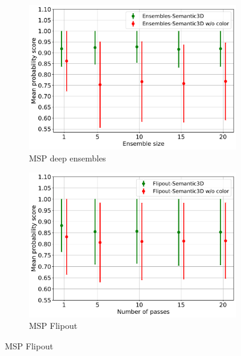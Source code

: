     \begin{figure}[!ht]
        \centering
        \begin{subfigure}{0.98\textwidth}
        \includegraphics[scale=0.6]{images/MSP/Ensembles_MSP_semvsemwoc.pdf}
        \caption{MSP deep ensembles}
        \label{fig:msp_ensembles_ood_2}
        \end{subfigure}
        \begin{subfigure}{0.98\textwidth}
        \includegraphics[scale=0.6]{images/MSP/Flipout_MSP_semvsemwoc.pdf}
        \caption{MSP Flipout}
        \label{fig:msp_flipout_ood_2}
        \end{subfigure}
    \end{figure}
